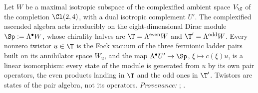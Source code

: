 Let $W$ be a maximal isotropic subspace of the complexified ambient space $V_{\C}$ of the completion $\Cl(2,4)$, with a dual isotropic complement $U'$. The complexified ascended algebra acts irreducibly on the eight-dimensional Dirac module $\Sp := \Lambda^{\bullet}W$, whose chirality halves are $\T = \Lambda^{\mathrm{even}}W$ and $\T' = \Lambda^{\mathrm{odd}}W$. Every nonzero twistor $u \in \T$ is the Fock vacuum of the three fermionic ladder pairs built on its annihilator space $W_{u}$, and the map $\Lambda^{\bullet}U' \to \Sp$, $\xi \mapsto c(\xi)u$, is a linear isomorphism: every state of the module is generated from $u$ by its own pair operators, the even products landing in $\T$ and the odd ones in $\T'$. Twistors are states of the pair algebra, not its operators. \emph{Provenance:} \cite[Thms.~3.1, 5.3]{ButlerT9}; \cite[Fact~2.2]{ButlerT12}.
